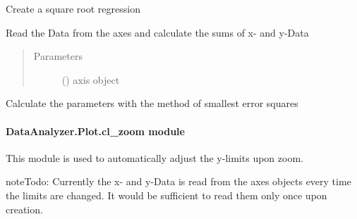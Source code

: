 \documentclass[letterpaper,10pt,english]{sphinxmanual}
\begin{document}

\begin{fulllineitems}
\label{\detokenize{DataAnalyzer.Plot:DataAnalyzer.Plot.cl_regression.Root}}
Create a square root regression

Read the Data from the axes and calculate the sums of x- and y-Data
\begin{quote}\begin{description}
\item[{Parameters}] \leavevmode
{} () \textendash{} axis object

\end{description}\end{quote}

\begin{fulllineitems}
\label{\detokenize{DataAnalyzer.Plot:DataAnalyzer.Plot.cl_regression.Root.fit}}
Calculate the parameters with the method of smallest error squares

\end{fulllineitems}


\end{fulllineitems}



\paragraph{DataAnalyzer.Plot.cl\_zoom module}
\label{\detokenize{DataAnalyzer.Plot:module-DataAnalyzer.Plot.cl_zoom}}\label{\detokenize{DataAnalyzer.Plot:dataanalyzer-plot-cl-zoom-module}}
This module is used to automatically adjust the y-limits upon zoom.

\begin{sphinxadmonition}{note}{\label{DataAnalyzer.Plot:index-2}Todo:}
Currently the x- and y-Data is read from the axes objects every time the limits are changed.
It would be sufficient to read them only once upon creation.
\end{sphinxadmonition}
\end{document}
